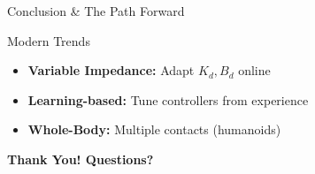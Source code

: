 \documentclass[10pt]{beamer}
\begin{document}
\begin{frame}{Conclusion \& The Path Forward}
    \vspace{5mm}
    \begin{block}{Modern Trends}
        \begin{itemize}
            \item \textbf{Variable Impedance:} Adapt $K_d, B_d$ online
            \item \textbf{Learning-based:} Tune controllers from experience
            \item \textbf{Whole-Body:} Multiple contacts (humanoids)
        \end{itemize}
    \end{block}
    
    \begin{center}
        \Large \textbf{Thank You! Questions?}
    \end{center}
\end{frame}
\end{document}
